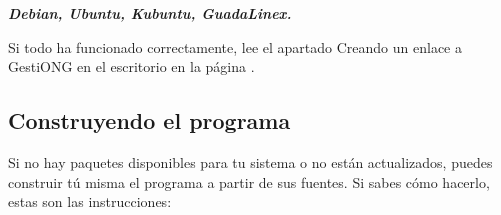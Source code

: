 \bigskip


\bigskip


\bigskip

{\bfseries\itshape
Debian, Ubuntu, Kubuntu, GuadaLinex.}



\begin{center}
\begin{minipage}{16.48cm}


\textstyleUserEntry{
\ \ }
\end{minipage}
\end{center}
Si todo ha funcionado correctamente, lee el apartado Creando un enlace a
GestiONG en el escritorio en la página \pageref{ref:creaenlace}.

\subsection{Construyendo el programa}
\label{ref:construyendoprograma}Si no hay paquetes disponibles para tu
sistema o no están actualizados, puedes construir tú misma el
programa a partir de sus fuentes. Si sabes cómo hacerlo, estas son
las instrucciones:



\begin{center}
\begin{minipage}{16.48cm}



\href{http://dfn.dl.sourceforge.net/sourceforge/gestiong/gestiong-0.3.3-alfa.tar.gz}{}






\end{minipage}
\end{center}


